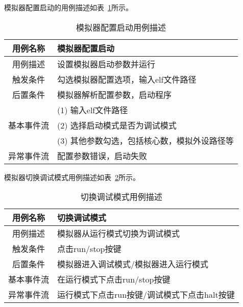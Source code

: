 模拟器配置启动的用例描述如表~\ref{tab:yongli1}所示。
\begin{table}[H]
  \centering
  \caption{模拟器配置启动用例描述}
  \label{tab:yongli1}
  \renewcommand\arraystretch{1.1}
  \begin{tabular}{cl}
    \toprule
用例名称 &	模拟器配置启动\\
    \midrule
用例描述 &	设置模拟器启动参数并运行\\ \hline
触发条件 &	勾选模拟器配置选项，输入elf文件路径\\ \hline
后置条件 &	模拟器解析配置参数，启动程序\\ \hline
	& (1)	输入elf文件路径 \\
  基本事件流 & (2)	选择启动模式是否为调试模式 \\
 & (3)	其他参数勾选，包括核心数，模拟外设路径等\\ \hline
异常事件流	& 配置参数错误，启动失败\\
    \bottomrule
  \end{tabular}
\end{table}


模拟器切换调试模式用例描述如表~\ref{tab:yongli2}所示。
\begin{table}[H]
  \centering
  \caption{切换调试模式用例描述}
  \label{tab:yongli2}
  \renewcommand\arraystretch{1.1}
  \begin{tabular}{cl}
    \toprule
用例名称	& 切换调试模式\\
    \midrule
用例描述	& 模拟器从运行模式切换为调试模式\\ \hline
触发条件	& 点击run/stop按键\\ \hline
后置条件	& 模拟器进入调试模式/模拟器进入运行模式\\ \hline
基本事件流	& 在运行模式下点击run/stop按键\\ \hline
异常事件流	& 运行模式下点击run按键/调试模式下点击halt按键\\
    \bottomrule
  \end{tabular}
\end{table}


